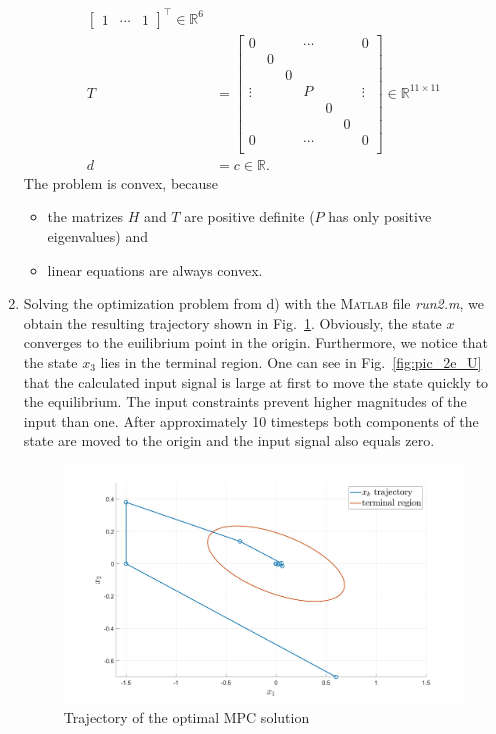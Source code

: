 \documentclass[12pt,pdftex,a4paper]{scrartcl}
\newcommand{\set}[1]{\mathbb{#1}}
\begin{document}
\begin{enumerate}
\begin{align*}
\begin{bmatrix}
			1 & \cdots & 1
		\end{bmatrix}^\top
		\in \set{R}^{6}	\\
		T &=
		\begin{bmatrix}
			0 & & & \cdots & & & 0 \\
			& 0 & & & & & \\
			& & 0 & & & & \\
			\vdots & & & P & & & \vdots \\
			& & & & 0 & & \\
			& & & & & 0 & \\
			0 & & & \cdots & & & 0 \\
		\end{bmatrix}
		\in \set{R}^{11 \times 11} \\
		d &= c \in \set{R}.
	\end{align*}
    The problem is convex, because 
    \begin{itemize}
    \item the matrizes $H$ and $T$ are positive definite ($P$ has only positive eigenvalues) and
    \item linear equations are always convex.
    \end{itemize}        
    
    \item Solving the optimization problem from d) with the \textsc{Matlab} file \emph{run2.m}, we obtain the resulting trajectory shown in Fig.~\ref{fig:pic_2e_X}. Obviously, the state $x$ converges to the euilibrium point in the origin. Furthermore, we notice that the state $x_3$ lies in the terminal region. One can see in Fig.~\ref{fig:pic_2e_U} that the calculated input signal is large at first to move the state quickly to the equilibrium. The input constraints prevent higher magnitudes of the input than one. After approximately 10 timesteps both components of the state are moved to the origin and the input signal also equals zero.
    \begin{figure}[H]
	\centering
	\includegraphics[scale=0.2]{pics/prop_2e_X.jpg}
	\caption{Trajectory of the optimal MPC solution}	
	\label{fig:pic_2e_X}
    \end{figure}


\end{enumerate}
\end{document}
